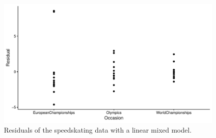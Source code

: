 \documentclass[]{book}\usepackage[]{graphicx}\usepackage[]{color}
\makeatletter
\def\maxwidth{ %
  \ifdim\Gin@nat@width>\linewidth
    \linewidth
  \else
    \Gin@nat@width
  \fi
}
\newenvironment{knitrout}{}{} %
\makeatother
\begin{document}
\begin{knitrout}
\color{fgcolor}\begin{figure}

{\centering \includegraphics[width=\maxwidth]{figure/nonparmixed_2-1} 

}

\caption[Residuals of the speedskating data with a linear mixed model]{Residuals of the speedskating data with a linear mixed model.}\label{fig:nonparmixed_2}
\end{figure}


\end{knitrout}
\end{document}
